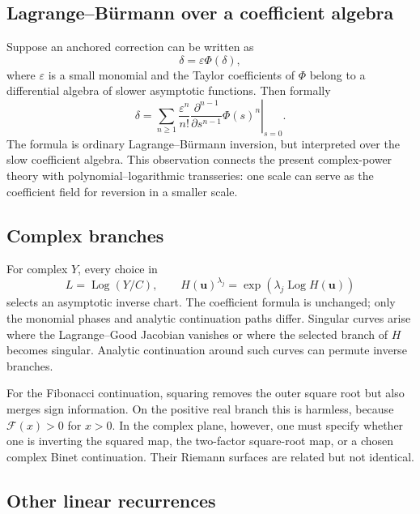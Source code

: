 \documentclass[11pt,oneside]{article}
\theoremstyle{plain}
\theoremstyle{definition}
\theoremstyle{remark}
\newcommand{\Fcal}{\mathcal{F}}
\newcommand{\Log}{\operatorname{Log}}
\begin{document}
\subsection{Lagrange--B\"urmann over a coefficient algebra}

Suppose an anchored correction can be written as
\begin{equation}
 \delta=\varepsilon\Phi(\delta),
 \label{eq:LB-coefficient-algebra}
\end{equation}
where \(\varepsilon\) is a small monomial and the Taylor coefficients of
\(\Phi\) belong to a differential algebra of slower asymptotic functions.
Then formally
\begin{equation}
 \delta=\sum_{n\ge1}\frac{\varepsilon^n}{n!}
 \left.\frac{\partial^{n-1}}{\partial s^{n-1}}
 \Phi(s)^n\right|_{s=0}.
 \label{eq:LB-general}
\end{equation}
The formula is ordinary Lagrange--B\"urmann inversion, but interpreted over the
slow coefficient algebra.  This observation connects the present
complex-power theory with polynomial--logarithmic transseries: one scale can
serve as the coefficient field for reversion in a smaller scale.

\subsection{Complex branches}

For complex \(Y\), every choice in
\begin{equation}
 L=\Log(Y/C),
 \qquad
 H(\bm u)^{\lambda_j}=\exp(\lambda_j\Log H(\bm u))
 \label{eq:complex-branch-choices}
\end{equation}
selects an asymptotic inverse chart.  The coefficient formula is unchanged;
only the monomial phases and analytic continuation paths differ.  Singular
curves arise where the Lagrange--Good Jacobian vanishes or where the selected
branch of \(H\) becomes singular.  Analytic continuation around such curves
can permute inverse branches.

For the Fibonacci continuation, squaring removes the outer square root but
also merges sign information.  On the positive real branch this is harmless,
because \(\Fcal(x)>0\) for \(x>0\).  In the complex plane, however, one must
specify whether one is inverting the squared map, the two-factor square-root
map, or a chosen complex Binet continuation.  Their Riemann surfaces are
related but not identical.

\subsection{Other linear recurrences}
\end{document}
